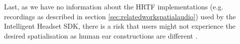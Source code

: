 Last, as we have no information about the HRTF implementations (e.g. recordings as described in section \ref{sec:relatedworkspatialaudio}) used by the Intelligent Headset SDK, there is a risk that users might not experience the desired spatialisation as human ear constructions are different \cite{brewster_human-computer_2003}.


















